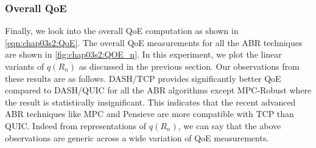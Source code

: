 \subsubsection{Overall QoE}
Finally, we look into the overall \ac{QoE} computation as shown in \eqn\ref{eqn:chap03s2:QoE}. The overall \ac{QoE} measurements for  all the \ac{ABR} techniques are shown in \fig\ref{fig:chap03s2:QOE_n}. In this experiment, we plot the linear variants of $q(R_n)$ as discussed in the previous section. Our observations from these results are as follows. DASH/TCP provides significantly better \ac{QoE} compared to DASH/QUIC for all the \ac{ABR} algorithms except MPC-Robust where the result is statistically insignificant. This indicates that the recent advanced \ac{ABR} techniques like MPC and Pensieve are more compatible with \ac{TCP} than \ac{QUIC}. Indeed from representations of $q(R_n)$, we can say that the above observations are generic across a wide variation of \ac{QoE} measurements.


